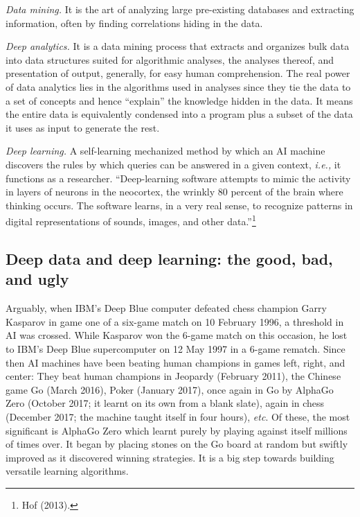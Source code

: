 \begin{multicols}{2}
\textit{Data mining.} It is the art of analyzing large pre-existing databases and extracting information, often by finding correlations hiding in the data.

\textit{Deep analytics.} It is a data mining process that extracts and organizes bulk data into data structures suited for algorithmic analyses, the analyses thereof, and presentation of output, generally, for easy human comprehension. The real power of data analytics lies in the algorithms used in analyses since they tie the data to a set of concepts and hence “explain” the knowledge hidden in the data. It means the entire data is equivalently condensed into a program plus a subset of the data it uses as input to generate the rest.

\textit{Deep learning.} A self-learning mechanized method by which an AI machine discovers the rules by which queries can be answered in a given context, \textit{i.e.,} it functions as a researcher. “Deep-learning software attempts to mimic the activity in layers of neurons in the neocortex, the wrinkly 80 percent of the brain where thinking occurs. The software learns, in a very real sense, to recognize patterns in digital representations of sounds, images, and other data.”\footnote{Hof (2013).}

\subsection{Deep data and deep learning: the good, bad, and ugly}

Arguably, when IBM's Deep Blue computer defeated chess champion Garry Kasparov in game one of a six-game match on 10 February 1996, a threshold in AI was crossed. While Kasparov won the 6-game match on this occasion, he lost to IBM's Deep Blue supercomputer on 12 May 1997 in a 6-game rematch. Since then AI machines have been beating human champions in games left, right, and center: They beat human champions in Jeopardy (February 2011), the Chinese game Go (March 2016), Poker (January 2017), once again in Go by AlphaGo Zero (October 2017; it learnt on its own from a blank slate), again in chess (December 2017; the machine taught itself in four hours), \textit{etc}. Of these, the most significant is AlphaGo Zero which learnt purely by playing against itself millions of times over. It began by placing stones on the Go board at random but swiftly improved as it discovered winning strategies. It is a big step towards building versatile learning algorithms.


\end{multicols}
